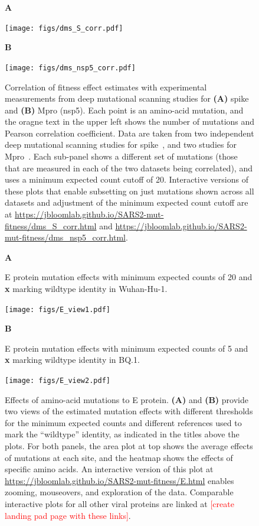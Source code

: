 \documentclass[9pt,twocolumn,twoside]{gsajnl_modified}
\newcommand\jdbcomment[1]{\textcolor{red}{[#1]}}
\begin{document}
\begin{figure}
{\bf \Large A}

\texttt{[image: figs/dms\_S\_corr.pdf]}
\vspace{0.05in}

{\bf \Large B}

\texttt{[image: figs/dms\_nsp5\_corr.pdf]}
\caption{
Correlation of fitness effect estimates with experimental measurements from deep mutational scanning studies for {\bf (A)} spike and {\bf (B)} Mpro (nsp5).
Each point is an amino-acid mutation, and the oragne text in the upper left shows the number of mutations and Pearson correlation coefficient.
Data are taken from two independent deep mutational scanning studies for spike~\citep{cite}, and two studies for Mpro~\citep{cite}.
Each sub-panel shows a different set of mutations (those that are measured in each of the two datasets being correlated), and uses a minimum expected count cutoff of 20.
Interactive versions of these plots that enable subsetting on just mutations shown across all datasets and adjustment of the minimum expected count cutoff are at \url{https://jbloomlab.github.io/SARS2-mut-fitness/dms_S_corr.html} and \url{https://jbloomlab.github.io/SARS2-mut-fitness/dms_nsp5_corr.html}.
\label{fig:dms_corr}
}
\end{figure}

\begin{figure}
{\bf \Large A}

E protein mutation effects with minimum expected counts of 20 and \textbf{x} marking wildtype identity in Wuhan-Hu-1.

\texttt{[image: figs/E\_view1.pdf]}

{\bf \Large B}

E protein mutation effects with minimum expected counts of 5 and \textbf{x} marking wildtype identity in BQ.1.

\texttt{[image: figs/E\_view2.pdf]}
\caption{
Effects of amino-acid mutations to E protein.
{\bf (A)} and {\bf (B)} provide two views of the estimated mutation effects with different thresholds for the minimum expected counts and different references used to mark the ``wildtype'' identity, as indicated in the titles above the plots.
For both panels, the area plot at top shows the average effects of mutations at each site, and the heatmap shows the effects of specific amino acids.
An interactive version of this plot at \url{https://jbloomlab.github.io/SARS2-mut-fitness/E.html} enables zooming, mouseovers, and exploration of the data.
Comparable interactive plots for all other viral proteins are linked at \jdbcomment{create landing pad page with these links}.
\label{fig:E}
}
\end{figure}
\end{document}
